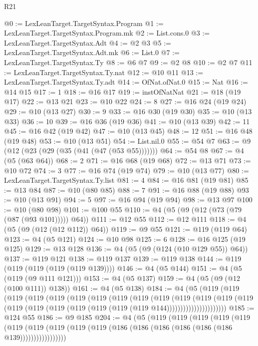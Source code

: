 \begin{lexlean}{R21}
\begin{coremodule}
@0 := LexLeanTarget.TargetSyntax.Program
@1 := LexLeanTarget.TargetSyntax.Program.mk
@2 := List.cons.{0}
@3 := LexLeanTarget.TargetSyntax.Adt
@4 := @2 @3
@5 := LexLeanTarget.TargetSyntax.Adt.mk
@6 := List.{0}
@7 := LexLeanTarget.TargetSyntax.Ty
@8 := @6 @7
@9 := @2 @8
@10 := @2 @7
@11 := LexLeanTarget.TargetSyntax.Ty.nat
@12 := @10 @11
@13 := LexLeanTarget.TargetSyntax.Ty.adt
@14 := OfNat.ofNat.{0}
@15 := Nat
@16 := @14 @15
@17 := 1
@18 := @16 @17
@19 := instOfNatNat
@21 := @18 (@19 @17)
@22 := @13 @21
@23 := @10 @22
@24 := 8
@27 := @16 @24 (@19 @24)
@29 := @10 (@13 @27)
@30 := 9
@33 := @16 @30 (@19 @30)
@35 := @10 (@13 @33)
@36 := 10
@39 := @16 @36 (@19 @36)
@41 := @10 (@13 @39)
@42 := 11
@45 := @16 @42 (@19 @42)
@47 := @10 (@13 @45)
@48 := 12
@51 := @16 @48 (@19 @48)
@53 := @10 (@13 @51)
@54 := List.nil.{0}
@55 := @54 @7
@63 := @9 (@12 (@23 (@29 (@35 (@41 (@47 (@53 @55)))))))
@64 := @54 @8
@67 := @4 (@5 (@63 @64))
@68 := 2
@71 := @16 @68 (@19 @68)
@72 := @13 @71
@73 := @10 @72
@74 := 3
@77 := @16 @74 (@19 @74)
@79 := @10 (@13 @77)
@80 := LexLeanTarget.TargetSyntax.Ty.list
@81 := 4
@84 := @16 @81 (@19 @81)
@85 := @13 @84
@87 := @10 (@80 @85)
@88 := 7
@91 := @16 @88 (@19 @88)
@93 := @10 (@13 @91)
@94 := 5
@97 := @16 @94 (@19 @94)
@98 := @13 @97
@100 := @10 (@80 @98)
@101 := @100 @55
@110 := @4 (@5 (@9 (@12 (@73 (@79 (@87 (@93 @101))))) @64))
@111 := @12 @55
@112 := @12 @111
@118 := @4 (@5 (@9 (@12 (@12 @112)) @64))
@119 := @9 @55
@121 := @119 (@119 @64)
@123 := @4 (@5 @121)
@124 := @10 @98
@125 := 6
@128 := @16 @125 (@19 @125)
@129 := @13 @128
@136 := @4 (@5 (@9 (@124 (@10 @129 @55)) @64))
@137 := @119 @121
@138 := @119 @137
@139 := @119 @138
@144 := @119 (@119 (@119 (@119 (@119 @139))))
@146 := @4 (@5 @144)
@151 := @4 (@5 (@119 (@9 @111 @121)))
@153 := @4 (@5 @137)
@159 := @4 (@5 (@9 (@12 (@100 @111)) @138))
@161 := @4 (@5 @138)
@184 := @4
    (@5
      (@119
        (@119
          (@119
            (@119
              (@119
                (@119
                  (@119
                    (@119
                      (@119
                        (@119
                          (@119
                            (@119
                              (@119
                                (@119
                                  (@119
                                    (@119 (@119 (@119 (@119 (@119 (@119 @144))))))))))))))))))))))
@185 := @124 @55
@186 := @9 @185
@204 := @4
    (@5
      (@119
        (@119
          (@119
            (@119
              (@119
                (@119
                  (@119 (@119 (@119 (@119 (@186 (@186 (@186 (@186 (@186 (@186 @139)))))))))))))))))

\end{coremodule}
\end{lexlean}
